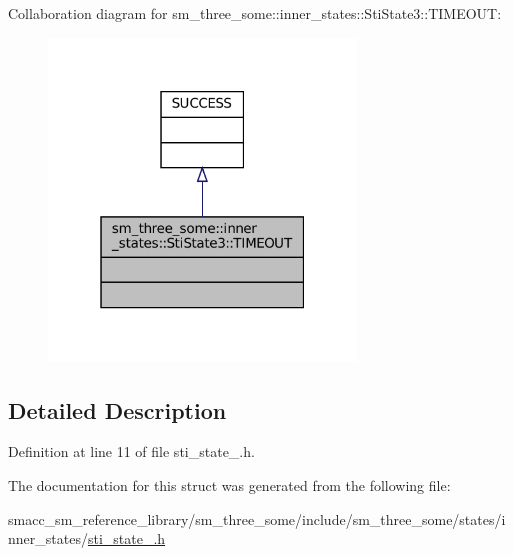 Collaboration diagram for sm\+\_\+three\+\_\+some\+:\+:inner\+\_\+states\+:\+:Sti\+State3\+:\+:T\+I\+M\+E\+O\+UT\+:
\nopagebreak
\begin{figure}[H]
\begin{center}
\leavevmode
\includegraphics[width=232pt]{structsm__three__some_1_1inner__states_1_1StiState3_1_1TIMEOUT__coll__graph}
\end{center}
\end{figure}


\subsection{Detailed Description}


Definition at line 11 of file sti\+\_\+state\+\_.\+h.



The documentation for this struct was generated from the following file\+:\begin{DoxyCompactItemize}
\item 
smacc\+\_\+sm\+\_\+reference\+\_\+library/sm\+\_\+three\+\_\+some/include/sm\+\_\+three\+\_\+some/states/inner\+\_\+states/\hyperlink{sm__three__some_2include_2sm__three__some_2states_2inner__states_2sti__state__3_8h}{sti\+\_\+state\+\_.\+h}\end{DoxyCompactItemize}
